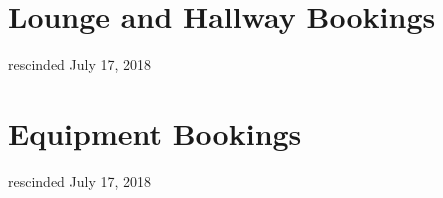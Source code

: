 \section{Lounge and Hallway Bookings}
rescinded July 17, 2018


\section{Equipment Bookings}
rescinded July 17, 2018